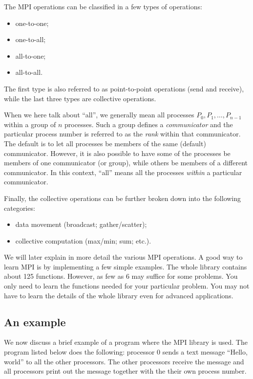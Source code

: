 The MPI operations can be classified in a few types of operations:
\begin{itemize}
\item one-to-one;
\item one-to-all;
\item all-to-one;
\item all-to-all.
\end{itemize}
The first type is also referred to as point-to-point operations (send and
receive), while the last three types are collective operations.

When we here talk about ``all'', we generally mean all processes $P_0, P_1,
\ldots, P_{n-1}$ within a group of $n$ processes. Such a group defines a
\emph{communicator} and the particular process number is referred to as the
\emph{rank} within that communicator. The default is to let all processes be
members of the same (default) communicator. However, it is also possible to have
some of the processes be members of one communicator (or group), while others be
members of a different communicator. In this context, ``all'' means all the
processes \emph{within} a particular communicator.

Finally, the collective operations can be further broken down into the
following categories:
\begin{itemize}
\item data movement (broadcast; gather/scatter);
\item collective computation (max/min; sum; etc.).
\end{itemize}

We will later explain in more detail the various MPI operations. A good way to
learn MPI is by implementing a few simple examples. The whole library contains
about 125 functions. However, as few as 6 may suffice for some problems. You
only need to learn the functions needed for your particular problem. You may not
have to learn the details of the whole library even for advanced applications.

\subsection{An example}

We now discuss a brief example of a program where the MPI library is used. The
program listed below does the following: processor 0 sends a text message
``Hello, world'' to all the other processors. The other processors receive the
message and all processors print out the message together with the their own
process number.

